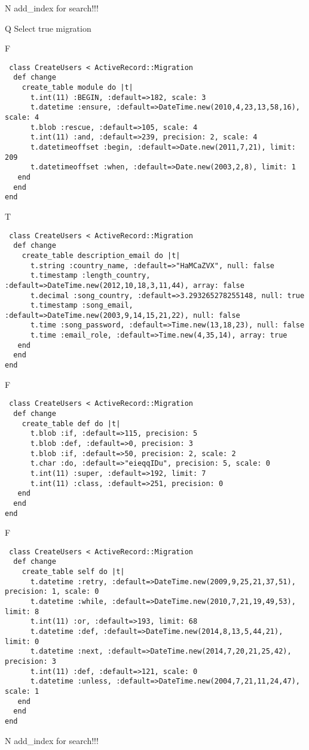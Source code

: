 N
add_index for search!!!
  
Q
Select true migration

F
\begin{verbatim}
 class CreateUsers < ActiveRecord::Migration 
  def change 
    create_table module do |t| 
      t.int(11) :BEGIN, :default=>182, scale: 3
      t.datetime :ensure, :default=>DateTime.new(2010,4,23,13,58,16), scale: 4
      t.blob :rescue, :default=>105, scale: 4
      t.int(11) :and, :default=>239, precision: 2, scale: 4
      t.datetimeoffset :begin, :default=>Date.new(2011,7,21), limit: 209
      t.datetimeoffset :when, :default=>Date.new(2003,2,8), limit: 1
   end 
  end 
end
\end{verbatim}

T
\begin{verbatim}
 class CreateUsers < ActiveRecord::Migration 
  def change 
    create_table description_email do |t| 
      t.string :country_name, :default=>"HaMCaZVX", null: false
      t.timestamp :length_country, :default=>DateTime.new(2012,10,18,3,11,44), array: false
      t.decimal :song_country, :default=>3.293265278255148, null: true
      t.timestamp :song_email, :default=>DateTime.new(2003,9,14,15,21,22), null: false
      t.time :song_password, :default=>Time.new(13,18,23), null: false
      t.time :email_role, :default=>Time.new(4,35,14), array: true
   end 
  end 
end
\end{verbatim}

F
\begin{verbatim}
 class CreateUsers < ActiveRecord::Migration 
  def change 
    create_table def do |t| 
      t.blob :if, :default=>115, precision: 5
      t.blob :def, :default=>0, precision: 3
      t.blob :if, :default=>50, precision: 2, scale: 2
      t.char :do, :default=>"eieqqIDu", precision: 5, scale: 0
      t.int(11) :super, :default=>192, limit: 7
      t.int(11) :class, :default=>251, precision: 0
   end 
  end 
end
\end{verbatim}

F
\begin{verbatim}
 class CreateUsers < ActiveRecord::Migration 
  def change 
    create_table self do |t| 
      t.datetime :retry, :default=>DateTime.new(2009,9,25,21,37,51), precision: 1, scale: 0
      t.datetime :while, :default=>DateTime.new(2010,7,21,19,49,53), limit: 8
      t.int(11) :or, :default=>193, limit: 68
      t.datetime :def, :default=>DateTime.new(2014,8,13,5,44,21), limit: 0
      t.datetime :next, :default=>DateTime.new(2014,7,20,21,25,42), precision: 3
      t.int(11) :def, :default=>121, scale: 0
      t.datetime :unless, :default=>DateTime.new(2004,7,21,11,24,47), scale: 1
   end 
  end 
end
\end{verbatim}
N
add_index for search!!!
  
